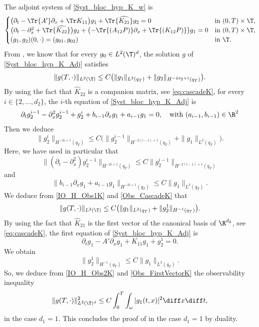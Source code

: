 The adjoint system of \eqref{Syst_bloc_hyp_K_w} is
\begin{equation} \label{Syst_bloc_hyp_K_Adj}
\begin{cases}
\bigl(\partial_t -\Tr{A'}\partial_x+\Tr K_{11}\bigr)g_1 +\Tr{\widehat{K_{21}}} g_2= 0
&\text{in}\ (0,T)\times \T,\!\\
\bigl(\partial_t - \partial_x^2+\Tr{\widehat{K_{22}}}\bigr)g_2 +\bigl(-\Tr{(A_{12}P)}\partial_x+\Tr{(K_{12}P)}\bigr)g_1 = 0 &\text{in}\ (0,T)\times \T,\!\\
(g_1,g_2)(0,\cdot)=(g_{01},g_{02}) & \text{in}\ \T.
\end{cases}
\end{equation}
From , we know that for every $g_0 \in L^2(\T)^d$, the solution $g$ of \eqref{Syst_bloc_hyp_K_Adj} satisfies
\begin{equation} \label{IO_H_Obs1K}
\| g(T,\cdot) \|_{L^2(\T)} \leq C \bigl(\| g_1\|_{L^2(q_T)} + \|g_2\|_{H^{-2d_2+1}(q_T)} \bigr).
\end{equation}
By using the fact that ${\widehat K}_{22}$ is a companion matrix, see \eqref{eq:cascadeK}, for every $i \in \{2, \dots, d_2\}$, the $i$-th equation of \eqref{Syst_bloc_hyp_K_Adj} is
\begin{equation*}
\partial_t g_2^{i-1} - \partial_x^2 g_2^{i-1} + g_2^{i} + b_{i-1} \partial_x g_1+ a_{i-1} g_1 =0,\quad \text{with}\ (a_{i-1}, b_{i-1}) \in \R^2
\end{equation*}
Then we deduce
\begin{equation}
\|g_2^{i}\|_{H^{-2i + 1 }(q_T)} \leq C \bigl(\|g_2^{i-1}\|_{H^{-2(i-1)+1}(q_T)} + \| g_1\|_{L^2(q_T)} \bigr).
\label{Obs_CascadeK}
\end{equation}
Here, we have used in particular that
\[
\| (\partial_t - \partial_x^{2})g_2^{i-1}\|_{H^{-2 i +1 }(q_T)} \leq C \|g_2^{i-1}\|_{H^{-2(i-1)+1}(q_T)}
\]
and
\[
\| b_{i-1} \partial_x g_1+ a_{i-1} g_1 \| _{H^{-2 i +1 }(q_T)} \leq C \|g_1\|_{L^2(q_T)}.
\]
We deduce from \eqref{IO_H_Obs1K} and \eqref{Obs_CascadeK} that
\begin{equation} \label{IO_H_Obs2K}
\| g(T,\cdot) \|_{L^2(\T)} \leq C \bigl(\| g_1\|_{L^2(q_T)} + \|g_2^1\|_{H^{-1}(q_T)} \bigr).
\end{equation}
By using the fact that ${\widehat K}_{21}$ is the first vector of the canonical basis of $\R^{d_2}$, see \eqref{eq:cascadeK}, the first equation of \eqref{Syst_bloc_hyp_K_Adj} is
\[
\partial_t g_1 - A' \partial_{x} g_1 + K_{11} g_1 + g_2^{1} = 0.
\]
We obtain
\begin{equation}
\label{Obs_FirstVectorK}
\|g_2^1\|_{H^{-1}(q_T)} \leq C \| g_1\|_{L^2(q_T)}.
\end{equation}
So, we deduce from \eqref{IO_H_Obs2K} and \eqref{Obs_FirstVectorK} the observability inequality
\[
\| g(T,\cdot) \|_{L^2(\T)^{d}}^2 \leq C \int_0^T \int_{\omega} |g_1(t,x)|^2 \diff x \diff t,
\]
in the case $d_1=1$. This concludes the proof of  in the case $d_1=1$ by duality.

